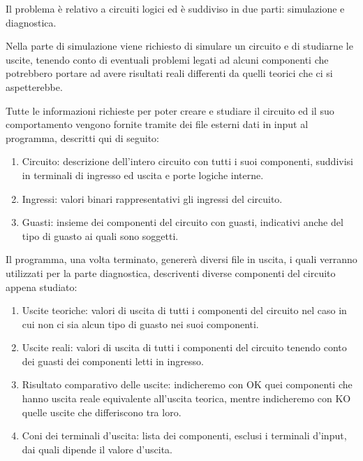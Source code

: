 Il problema è relativo a circuiti logici ed è suddiviso in due parti:
simulazione e diagnostica.

Nella parte di simulazione viene richiesto di simulare un circuito e di
studiarne le uscite, tenendo conto di eventuali problemi legati ad alcuni
componenti che potrebbero portare ad avere risultati reali differenti da quelli
teorici che ci si aspetterebbe.

Tutte le informazioni richieste per poter creare e studiare il circuito ed il
suo comportamento vengono fornite tramite dei file esterni dati in input al
programma, descritti qui di seguito:

\begin{enumerate}
\item Circuito: descrizione dell'intero circuito con tutti i suoi componenti,
 suddivisi in terminali di ingresso ed uscita e porte logiche interne.

\item Ingressi: valori binari rappresentativi gli ingressi del circuito.

\item Guasti: insieme dei componenti del circuito con guasti, indicativi anche del
 tipo di guasto ai quali sono soggetti.

\end{enumerate}

Il programma, una volta terminato, genererà diversi file in uscita, i quali
verranno utilizzati per la parte diagnostica, descriventi diverse componenti del
circuito appena studiato:

\begin{enumerate}
\item Uscite teoriche: valori di uscita di tutti i componenti del circuito nel
 caso in cui non ci sia alcun tipo di guasto nei suoi componenti.

\item Uscite reali: valori di uscita di tutti i componenti del circuito tenendo
 conto dei guasti dei componenti letti in ingresso.

\item Risultato comparativo delle uscite: indicheremo con OK quei componenti che
 hanno uscita reale equivalente all'uscita teorica, mentre indicheremo con KO
 quelle uscite che differiscono tra loro.

\item Coni dei terminali d'uscita: lista dei componenti, esclusi i terminali
 d'input, dai quali dipende il valore d'uscita.

\end{enumerate}

